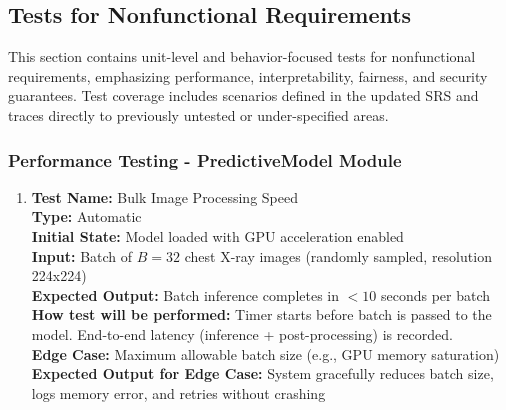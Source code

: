 \documentclass[12pt, titlepage]{article}
\begin{document}


\subsection{Tests for Nonfunctional Requirements}


This section contains unit-level and behavior-focused tests for nonfunctional requirements, emphasizing performance, interpretability, fairness, and security guarantees. Test coverage includes scenarios defined in the updated SRS and traces directly to previously untested or under-specified areas.

\subsubsection{Performance Testing - PredictiveModel Module}

\begin{enumerate}
  \item \textbf{Test Name:} Bulk Image Processing Speed \\
  \textbf{Type:} Automatic \\
  \textbf{Initial State:} Model loaded with GPU acceleration enabled \\
  \textbf{Input:} Batch of $B=32$ chest X-ray images (randomly sampled, resolution 224x224) \\
  \textbf{Expected Output:} Batch inference completes in $< 10$ seconds per batch \\
  \textbf{How test will be performed:} Timer starts before batch is passed to the model. End-to-end latency (inference + post-processing) is recorded. \\
  \textbf{Edge Case:} Maximum allowable batch size (e.g., GPU memory saturation) \\
  \textbf{Expected Output for Edge Case:} System gracefully reduces batch size, logs memory error, and retries without crashing \\
\end{enumerate}
\end{document}
